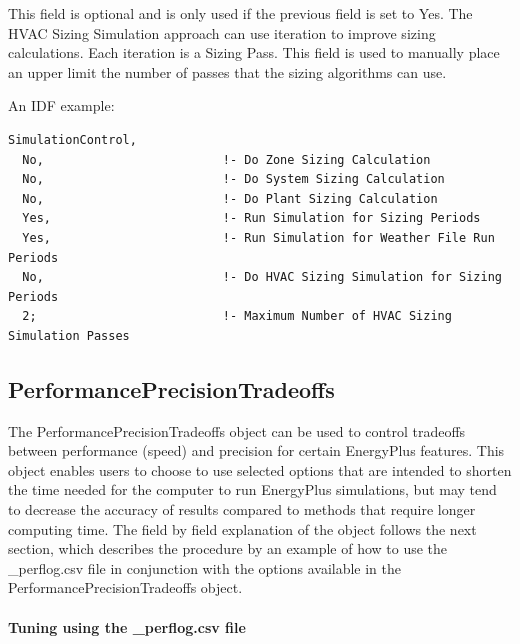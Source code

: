 This field is optional and is only used if the previous field is set to Yes. The HVAC Sizing Simulation approach can use iteration to improve sizing calculations. Each iteration is a Sizing Pass. This field is used to manually place an upper limit the number of passes that the sizing algorithms can use.

An IDF example:

\begin{lstlisting}
SimulationControl,
  No,                         !- Do Zone Sizing Calculation
  No,                         !- Do System Sizing Calculation
  No,                         !- Do Plant Sizing Calculation
  Yes,                        !- Run Simulation for Sizing Periods
  Yes,                        !- Run Simulation for Weather File Run Periods
  No,                         !- Do HVAC Sizing Simulation for Sizing Periods
  2;                          !- Maximum Number of HVAC Sizing Simulation Passes
\end{lstlisting}

\subsection{PerformancePrecisionTradeoffs}\label{performanceprecisiontradeoffs}

The PerformancePrecisionTradeoffs object can be used to control tradeoffs between performance (speed) and precision for certain EnergyPlus features. This object enables users to choose to use selected options that are intended to shorten the time needed for the computer to run EnergyPlus simulations, but may tend to decrease the accuracy of results compared to methods that require longer computing time. The field by field explanation of the object follows the next section, which describes the procedure by an example of how to use the \_perflog.csv file in conjunction with the options available in the PerformancePrecisionTradeoffs object.

\paragraph{Tuning using the \_perflog.csv file}\label{tuning-using-perlog-csv-file}

